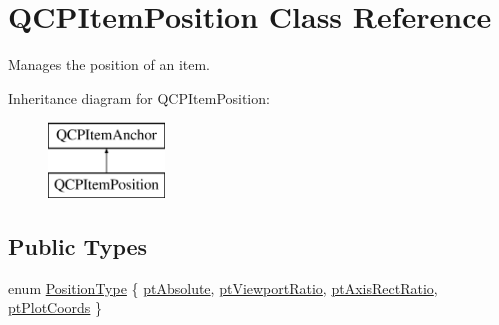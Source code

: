 \hypertarget{class_q_c_p_item_position}{}\section{Q\+C\+P\+Item\+Position Class Reference}
\label{class_q_c_p_item_position}


Manages the position of an item.  


Inheritance diagram for Q\+C\+P\+Item\+Position\+:\begin{figure}[H]
\begin{center}
\leavevmode
\includegraphics[height=2.000000cm]{class_q_c_p_item_position}
\end{center}
\end{figure}
\subsection*{Public Types}
\begin{DoxyCompactItemize}
\item 
enum \hyperlink{class_q_c_p_item_position_aad9936c22bf43e3d358552f6e86dbdc8}{Position\+Type} \{ \hyperlink{class_q_c_p_item_position_aad9936c22bf43e3d358552f6e86dbdc8a564f5e53e550ead1ec5fc7fc7d0b73e0}{pt\+Absolute}, 
\hyperlink{class_q_c_p_item_position_aad9936c22bf43e3d358552f6e86dbdc8ac7d6aa89ceacb39658b0d6da061c789a}{pt\+Viewport\+Ratio}, 
\hyperlink{class_q_c_p_item_position_aad9936c22bf43e3d358552f6e86dbdc8a01080fd00eaf09fa238ef6b73bbfef75}{pt\+Axis\+Rect\+Ratio}, 
\hyperlink{class_q_c_p_item_position_aad9936c22bf43e3d358552f6e86dbdc8ad5ffb8dc99ad73263f7010c77342294c}{pt\+Plot\+Coords}
 \}
\end{DoxyCompactItemize}
